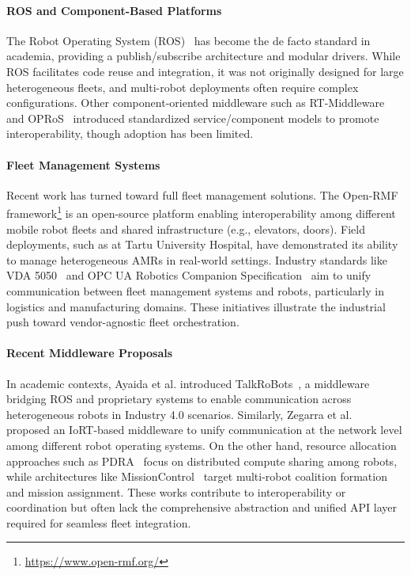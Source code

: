 \documentclass[conference]{IEEEtran}
\begin{document}
\paragraph{ROS and Component-Based Platforms} 
The Robot Operating System (ROS)~\cite{quigley2009ros} has become the de facto standard in academia, 
 providing a publish/subscribe architecture and modular drivers. 
% 
While ROS facilitates code reuse and integration, it was not originally designed for large heterogeneous fleets, 
 and multi-robot deployments often require complex configurations. 
% 
Other component-oriented middleware such as RT-Middleware~\cite{DBLP:conf/iros/AndoSKKY05} 
 and OPRoS~\cite{jang2010opros} introduced standardized service/component models 
 to promote interoperability, though adoption has been limited.

\paragraph{Fleet Management Systems} 
Recent work has turned toward full fleet management solutions. 
%
The Open-RMF framework\footnote{\url{https://www.open-rmf.org/}} is an open-source platform 
 enabling interoperability among different mobile robot fleets and shared infrastructure (e.g., elevators, doors). 
% 
Field deployments, such as at Tartu University Hospital, have demonstrated its ability 
 to manage heterogeneous AMRs in real-world settings. 
% 
Industry standards like VDA 5050~\cite{franke2023identification} 
 and OPC UA Robotics Companion Specification~\cite{DBLP:conf/etfa/ProfanterB0K19} 
 aim to unify communication between fleet management systems and robots, 
 particularly in logistics and manufacturing domains. 
%  
These initiatives illustrate the industrial push toward vendor-agnostic fleet orchestration.

\paragraph{Recent Middleware Proposals} 
In academic contexts, Ayaida et al. introduced TalkRoBots~\cite{ayaida2022fi}, 
 a middleware bridging ROS and proprietary systems to enable communication 
 across heterogeneous robots in Industry 4.0 scenarios. 
% 
Similarly, Zegarra et al.~\cite{cuadroszegarra2024jsan} proposed an IoRT-based middleware 
 to unify communication at the network level among different robot operating systems. 
% 
On the other hand, resource allocation approaches such as PDRA~\cite{DBLP:conf/iros/RossiVNSH20} 
 focus on distributed compute sharing among robots, 
 while architectures like MissionControl~\cite{DBLP:journals/jss/RodriguesCAMRP22} 
  target multi-robot coalition formation and mission assignment. 
%  
These works contribute to interoperability or coordination but often lack the comprehensive abstraction 
 and unified API layer required for seamless fleet integration.
\end{document}
